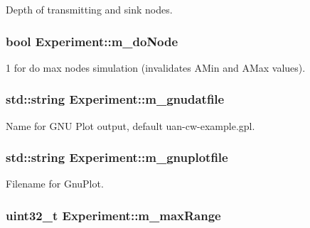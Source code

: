 Depth of transmitting and sink nodes. 

\subsubsection[{\texorpdfstring{m\+\_\+do\+Node}{m_doNode}}]{\setlength{\rightskip}{0pt plus 5cm}bool Experiment\+::m\+\_\+do\+Node}\hypertarget{classExperiment_a7fe0a03d1eb287247ac02760bf3a3dd5}{}\label{classExperiment_a7fe0a03d1eb287247ac02760bf3a3dd5}


1 for do max nodes simulation (invalidates A\+Min and A\+Max values). 

\subsubsection[{\texorpdfstring{m\+\_\+gnudatfile}{m_gnudatfile}}]{\setlength{\rightskip}{0pt plus 5cm}std\+::string Experiment\+::m\+\_\+gnudatfile}\hypertarget{classExperiment_aaa700bd4f3a5f4cf40c866b38ea106e4}{}\label{classExperiment_aaa700bd4f3a5f4cf40c866b38ea106e4}


Name for G\+NU Plot output, default uan-\/cw-\/example.\+gpl. 

\subsubsection[{\texorpdfstring{m\+\_\+gnuplotfile}{m_gnuplotfile}}]{\setlength{\rightskip}{0pt plus 5cm}std\+::string Experiment\+::m\+\_\+gnuplotfile}\hypertarget{classExperiment_af7aa1ff58f32f02958b76e48bd2e3c6e}{}\label{classExperiment_af7aa1ff58f32f02958b76e48bd2e3c6e}


Filename for Gnu\+Plot. 

\subsubsection[{\texorpdfstring{m\+\_\+max\+Range}{m_maxRange}}]{\setlength{\rightskip}{0pt plus 5cm}uint32\+\_\+t Experiment\+::m\+\_\+max\+Range}\hypertarget{classExperiment_ae46d510ef227a0617af6b665c5ac3d9f}{}\label{classExperiment_ae46d510ef227a0617af6b665c5ac3d9f}


